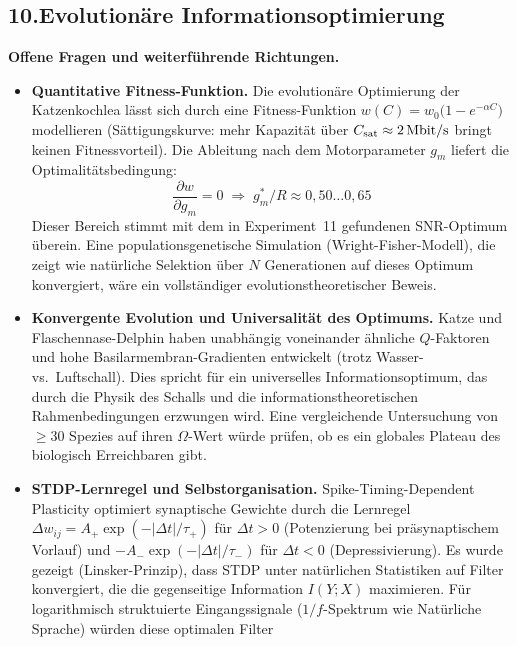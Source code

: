 ﻿\documentclass[12pt,a4paper,titlepage]{report}
\begin{document}
\subsection*{10.\enspace Evolutionäre Informationsoptimierung}

\textbf{Offene Fragen und weiterführende Richtungen.}
\begin{itemize}[leftmargin=2em]
  \item \textbf{Quantitative Fitness-Funktion.}
    Die evolutionäre Optimierung der Katzenkochlea lässt sich
    durch eine Fitness-Funktion
    $w(C) = w_0\bigl(1 - e^{-\alpha C}\bigr)$
    modellieren (Sättigungskurve: mehr Kapazität über
    $C_{\rm sat}\approx2\,\mathrm{Mbit/s}$ bringt keinen Fitnessvorteil).
    Die Ableitung nach dem Motorparameter $g_m$ liefert die
    Optimalitätsbedingung:
    \[
      \frac{\partial w}{\partial g_m} = 0
      \;\Longrightarrow\;
      g_m^* / R \approx 0{,}50\ldots0{,}65
    \]
    Dieser Bereich stimmt mit dem in Experiment~11 gefundenen
    SNR-Optimum überein.
    Eine popula\-tionsgenetische Simulation (Wright-Fisher-Modell),
    die zeigt wie natürliche Selektion über $N$ Generationen
    auf dieses Optimum konvergiert, wäre ein
    vollständiger evolutionstheoretischer Beweis.
  \item \textbf{Konvergente Evolution und Universalität des Optimums.}
    Katze und Flaschen\-nase-Delphin haben unabhängig voneinander
    ähnliche $Q$-Faktoren und hohe Basilar\-membran-Gradienten entwickelt
    (trotz Wasser- vs.\ Luftschall).
    Dies spricht für ein universelles Informationsoptimum,
    das durch die Physik des Schalls und die informationstheoretischen
    Rahmenbedingungen erzwungen wird.
    Eine vergleichende Untersuchung von $\geq 30$ Spezies
    auf ihren $\Omega$-Wert würde prüfen, ob es
    ein globales Plateau des biologisch Erreichbaren gibt.
  \item \textbf{STDP-Lernregel und Selbstorganisation.}
    Spike-Timing-Dependent Plasticity optimiert synaptische Gewichte
    durch die Lernregel
    $\Delta w_{ij} = A_+\exp(-|\Delta t|/\tau_+)$ für $\Delta t > 0$
    (Potenzierung bei präsynaptischem Vorlauf) und
    $-A_-\exp(-|\Delta t|/\tau_-)$ für $\Delta t < 0$ (Depressivierung).
    Es wurde gezeigt (Linsker-Prinzip), dass STDP unter natürlichen Statistiken
    auf Filter konvergiert, die die gegenseitige Information $I(Y;X)$
    maximieren.
    Für logarithmisch struktuierte Eingangssignale ($1/f$-Spektrum
    wie Natürliche Sprache) würden diese optimalen Filter

\end{itemize}
\end{document}
